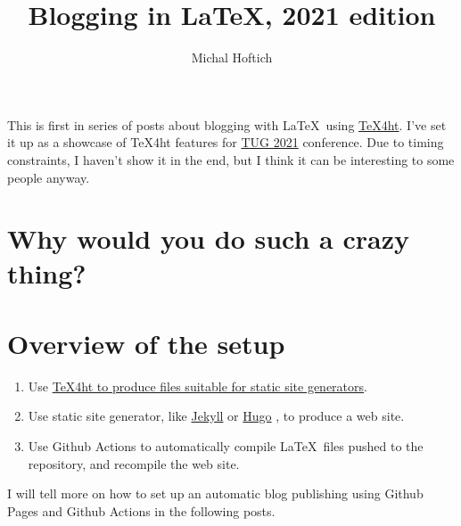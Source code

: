 \documentclass{article}
\title{Blogging in LaTeX, 2021 edition}
\author{Michal Hoftich}
\begin{document}
\maketitle


This is first in series of posts about blogging with \LaTeX\ using
\href{https://tug.org/tex4ht/}{\TeX4ht}. I've set it up as a showcase of
\TeX4ht features for \href{https://tug.org/tug2021/}{TUG 2021} conference.
Due to timing constraints, I haven't show it in the end, but I think it 
can be interesting to some people anyway.

\section*{Why would you do such a crazy thing?}



\section*{Overview of the setup}

\begin{enumerate}
\item Use \href{/testblog/2021/07/30/how-to-blog-with-tex4ht.html}
{\TeX4ht to produce files suitable for static site generators}.
\item Use static site generator, like \href{https://jekyllrb.com/}{Jekyll}
or \href{https://gohugo.io/}{Hugo}
, to produce a web site.
\item Use Github Actions to automatically compile \LaTeX\ files pushed
to the repository, and recompile the web site. 
\end{enumerate}

I will tell more on how to set up an automatic
blog publishing using Github Pages and Github Actions in the following posts.
\end{document}
